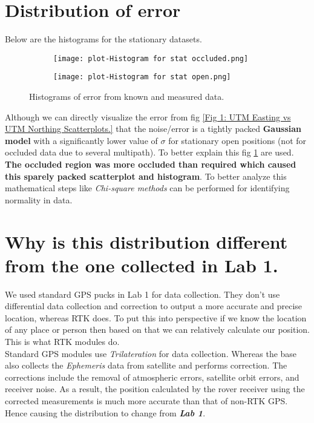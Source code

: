 \documentclass[a4paper]{article}
\begin{document}
\section{Distribution of error}
Below are the histograms for the stationary datasets.
\begin{figure}[h]
\begin{subfigure}{}
     \texttt{[image: plot-Histogram for stat occluded.png]}
\end{subfigure}
\begin{subfigure}{}
    \texttt{[image: plot-Histogram for stat open.png]}
\end{subfigure}
\caption{Histograms of error from known and measured data.}
\label{Fig2: Histograms}
\end{figure}
Although we can directly visualize the error from fig \ref{Fig 1: UTM Easting vs UTM Northing Scatterplots.} that the noise/error is a tightly packed \textbf{Gaussian model} with a significantly lower value of $\sigma$ for stationary open positions (not for occluded data due to several multipath). To better explain this fig \ref{Fig2: Histograms} are used. \textbf{The occluded region was more occluded than required which caused this sparely packed scatterplot and histogram}. To better analyze this mathematical steps like \textit{Chi-square methods} can be performed for identifying normality in data.
\section{Why is this distribution different from the one collected in Lab 1.}
We used standard GPS pucks in Lab 1 for data collection. They don't use differential data  collection and correction to output a more accurate and precise location, whereas RTK does. To put this into perspective if we know the location of any place or person then based on that we can relatively calculate our position. This is what RTK modules do.\\
Standard GPS modules use \textit{Trilateration} for data collection. Whereas the base also collects the \textit{Ephemeris} data from satellite and performs correction. The corrections include the removal of atmospheric errors, satellite orbit errors, and receiver noise. As a result, the position calculated by the rover receiver using the corrected measurements is much more accurate than that of non-RTK GPS. Hence causing the distribution to change from \textbf{\textit{Lab 1}}.
\end{document}
